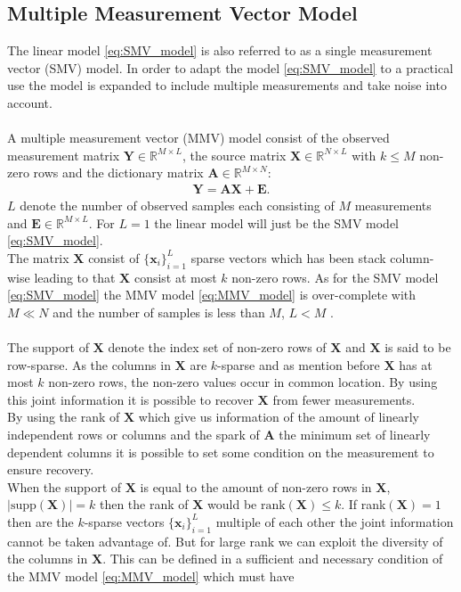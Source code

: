 \subsection{Multiple Measurement Vector Model}
The linear model \eqref{eq:SMV_model} is also referred to as a single measurement vector (SMV) model. In order to adapt the model \eqref{eq:SMV_model} to a practical use the model is expanded to include multiple measurements and take noise into account.
\\ \\
A multiple measurement vector (MMV) model consist of the observed measurement matrix $\mathbf{Y} \in \mathbb{R}^{M \times L}$, the source matrix $\mathbf{X} \in \mathbb{R}^{N \times L}$ with $k \leq M$ non-zero rows and the dictionary matrix $\mathbf{A} \in \mathbb{R}^{M \times N}$:
\begin{align}\label{eq:MMV_model}
\mathbf{Y} = \mathbf{AX}+\textbf{E}.
\end{align}
$L$ denote the number of observed samples each consisting of $M$ measurements and $\textbf{E} \in \mathbb{R}^{M \times L}$. For $L = 1$ the linear model will just be the SMV model \eqref{eq:SMV_model}. 
\\
The matrix $\mathbf{X}$ consist of $\lbrace \mathbf{x}_i \rbrace_{i=1}^L$ sparse vectors which has been stack column-wise leading to that $\mathbf{X}$ consist at most $k$ non-zero rows. As for the SMV model \eqref{eq:SMV_model} the MMV model \eqref{eq:MMV_model} is over-complete with $M \ll N$ and the number of samples is less than $M$, $L < M$ \cite[p. 42]{CS}.
\\ \\
The support of $\mathbf{X}$ denote the index set of non-zero rows of $\mathbf{X}$ and $\mathbf{X}$ is said to be row-sparse. As the columns in $\mathbf{X}$ are $k$-sparse and as mention before $\mathbf{X}$ has at most $k$ non-zero rows, the non-zero values occur in common location. By using this joint information it is possible to recover $\mathbf{X}$ from fewer measurements.
\\
By using the rank of $\mathbf{X}$ which give us information of the amount of linearly independent rows or columns and the spark of $\mathbf{A}$ the minimum set of linearly dependent columns it is possible to set some condition on the measurement to ensure recovery.
\\
When the support of $\mathbf{X}$ is equal to the amount of non-zero rows in $\mathbf{X}$, $\vert \text{supp}(\mathbf{X})\vert = k$ then the rank of $\mathbf{X}$ would be $\text{rank}(\mathbf{X}) \leq k$. If rank$(\mathbf{X}) = 1$ then are the $k$-sparse vectors $\lbrace \mathbf{x}_i \rbrace_{i=1}^L$ multiple of each other the joint information cannot be taken advantage of. But for large rank we can exploit the diversity of the columns in $\mathbf{X}$. This can be defined in a sufficient and necessary condition of the MMV model \eqref{eq:MMV_model} which must have

